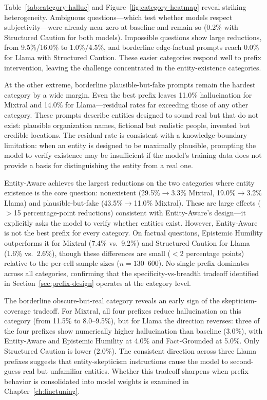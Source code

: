 Table~\ref{tab:category-halluc} and Figure~\ref{fig:category-heatmap} reveal striking heterogeneity.  Ambiguous questions---which test whether models respect subjectivity---were already near-zero at baseline and remain so (0.2\% with Structured Caution for both models).  Impossible questions show large reductions, from 9.5\%/16.0\% to 1.0\%/4.5\%, and borderline edge-factual prompts reach 0.0\% for Llama with Structured Caution.  These easier categories respond well to prefix intervention, leaving the challenge concentrated in the entity-existence categories.

At the other extreme, borderline plausible-but-fake prompts remain the hardest category by a wide margin.  Even the best prefix leaves 11.0\% hallucination for Mixtral and 14.0\% for Llama---residual rates far exceeding those of any other category.  These prompts describe entities designed to sound real but that do not exist: plausible organization names, fictional but realistic people, invented but credible locations.  The residual rate is consistent with a knowledge-boundary limitation: when an entity is designed to be maximally plausible, prompting the model to verify existence may be insufficient if the model's training data does not provide a basis for distinguishing the entity from a real one.

Entity-Aware achieves the largest reductions on the two categories where entity existence is the core question: nonexistent (29.5\%$\to$3.3\% Mixtral, 19.0\%$\to$3.2\% Llama) and plausible-but-fake (43.5\%$\to$11.0\% Mixtral).  These are large effects ($>$15 percentage-point reductions) consistent with Entity-Aware's design---it explicitly asks the model to verify whether entities exist.  However, Entity-Aware is not the best prefix for every category.  On factual questions, Epistemic Humility outperforms it for Mixtral (7.4\% vs.\ 9.2\%) and Structured Caution for Llama (1.6\% vs.\ 2.6\%), though these differences are small ($<$2 percentage points) relative to the per-cell sample sizes ($n = 130$--$600$).  No single prefix dominates across all categories, confirming that the specificity-vs-breadth tradeoff identified in Section~\ref{sec:prefix-design} operates at the category level.

The borderline obscure-but-real category reveals an early sign of the skepticism-coverage tradeoff.  For Mixtral, all four prefixes reduce hallucination on this category (from 11.5\% to 8.0--9.5\%), but for Llama the direction reverses: three of the four prefixes show numerically higher hallucination than baseline (3.0\%), with Entity-Aware and Epistemic Humility at 4.0\% and Fact-Grounded at 5.0\%.  Only Structured Caution is lower (2.0\%).  The consistent direction across three Llama prefixes suggests that entity-skepticism instructions cause the model to second-guess real but unfamiliar entities.  Whether this tradeoff sharpens when prefix behavior is consolidated into model weights is examined in Chapter~\ref{ch:finetuning}.

